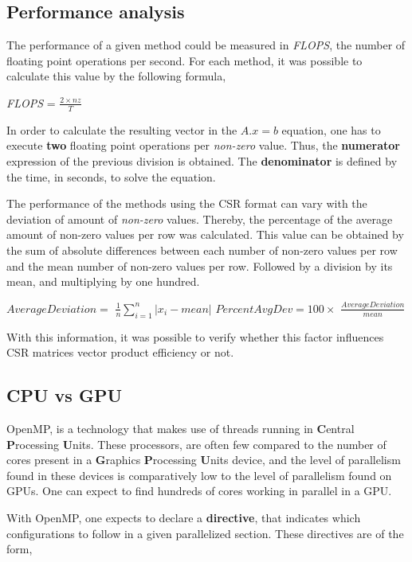 \documentclass[12pt]{article}
\begin{document}
\subsection*{Performance analysis}

\par The performance of a given method could be measured in \textit{FLOPS}, the number of floating point operations per second. For each method, it was possible to calculate this value by the following formula,

\begin{center}
\large
\textit{FLOPS} = 
\huge
$
\frac{2 \times nz}{T}
$
\end{center}

\par In order to calculate the resulting vector in the $A.x = b$ equation, one has to execute \textbf{two} floating point operations per \textit{non-zero} value. Thus, the \textbf{numerator} expression of the previous division is obtained. The \textbf{denominator} is defined by the time, in seconds, to solve the equation. 
\par The performance of the methods using the CSR format can vary with the deviation of amount of \textit{non-zero} values. Thereby, the percentage of the average amount of non-zero values per row was calculated. This value can be obtained by the sum of absolute differences between each number of non-zero values per row and the mean number of non-zero values per row. Followed by a division by its mean, and multiplying by one hundred. 

\begin{center}
\large
$
	AverageDeviation =
$
\Large
$
	\frac{1}{n}\sum_{i=1}^{n} | x_i - mean |
$
\linebreak
\linebreak
\large
$
	PercentAvgDev = 100 \times
$
\Large
$
	\frac{AverageDeviation}{mean}
$
\end{center}

\par With this information, it was possible to verify whether this factor influences CSR matrices vector product efficiency or not.

\subsection*{CPU vs GPU}
OpenMP, is a technology that makes use of threads running in \textbf{C}entral \textbf{P}rocessing \textbf{U}nits. These processors, are often few compared to the number of cores present in a \textbf{G}raphics \textbf{P}rocessing \textbf{U}nits device, and the level of parallelism found in these devices is comparatively low to the level of parallelism found on GPUs. One can expect to find hundreds of cores working in parallel in a GPU.
\par With OpenMP, one expects to declare a \textbf{directive}, that indicates which configurations to follow in a given parallelized section. These directives are of the form,
\end{document}
